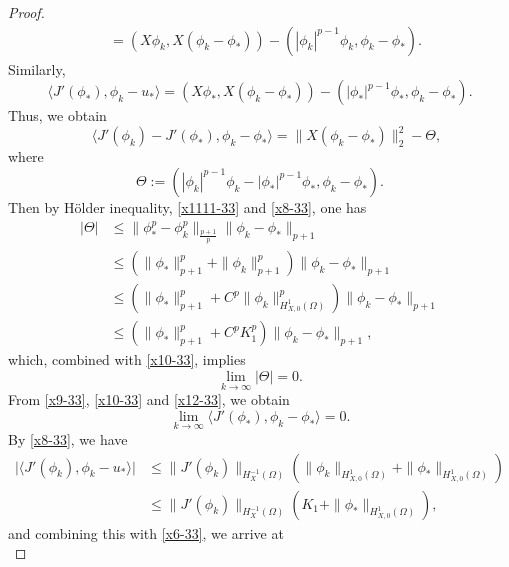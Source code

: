 \documentclass[11pt,a4paper]{article}
\numberwithin{equation}{section}
\numberwithin{remark}{section}
\begin{document}
\begin{proof}
\begin{equation*}
\begin{split}
&=\left(X\phi_k,X(\phi_k-\phi_*)\right)-\left(|\phi_k|^{p-1}\phi_k,\phi_k-\phi_*\right).
\end{split}
\end{equation*}
Similarly,
\begin{equation}\label{x12-33}
\langle J'(\phi_*),\phi_k-u_*\rangle=(X\phi_*,X(\phi_k-\phi_*))-\left(|\phi_*|^{p-1}\phi_*,\phi_k-\phi_*\right).
\end{equation}
Thus, we obtain
\begin{equation}\label{x16-33}
\quad \langle J'(\phi_k)-J'(\phi_*),\phi_k-\phi_*\rangle=\|X(\phi_k-\phi_*)\|_2^2-\Theta,
\end{equation}
where $$\Theta:=\left(|\phi_k|^{p-1}\phi_k-|\phi_*|^{p-1}\phi_*,\phi_k-\phi_*\right).$$
Then by H\"{o}lder inequality, \eqref{x1111-33} and \eqref{x8-33}, one has
\begin{equation*}
\begin{split}
|\Theta|&\leq\|\phi_*^p-\phi_k^p\|_{\frac{p+1}{p}}\|\phi_k-\phi_*\|_{p+1}\\
&\leq\left(\|\phi_*\|_{p+1}^p+\|\phi_k\|_{p+1}^p\right)\|\phi_k-\phi_*\|_{p+1}\\
&\leq\left(\|\phi_*\|_{p+1}^p+C^p\|\phi_k\|_{H_{X,0}^1(\Omega)}^p\right)\|\phi_k-\phi_*\|_{p+1}\\
&\leq\left(\|\phi_*\|_{p+1}^p+C^pK_1^p\right)\|\phi_k-\phi_*\|_{p+1},
\end{split}
\end{equation*}
which, combined with \eqref{x10-33}, implies
\begin{equation}\label{x11-33}
\lim_{k\rightarrow\infty}|\Theta|=0.
\end{equation}
From \eqref{x9-33}, \eqref{x10-33} and \eqref{x12-33}, we obtain
\begin{equation}\label{x13-33}
\lim_{k\rightarrow\infty}\langle J'(\phi_*),\phi_k-\phi_*\rangle=0.
\end{equation}
By \eqref{x8-33}, we have
\begin{equation*}
\begin{split}
\big|\langle J'(\phi_k),\phi_k-u_*\rangle\big|&\leq\|J'(\phi_k)\|_{H_X^{-1}(\Omega)}\left(\|\phi_k\|_{H_{X,0}^1(\Omega)}+\|\phi_*\|_{H_{X,0}^1(\Omega)}\right)\\
&\leq\|J'(\phi_k)\|_{H_X^{-1}(\Omega)}\left(K_1+\|\phi_*\|_{H_{X,0}^1(\Omega)}\right),
\end{split}
\end{equation*}
and combining this with \eqref{x6-33}, we arrive at
\begin{equation}\label{x15-33}

\end{equation}
\end{proof}
\end{document}
